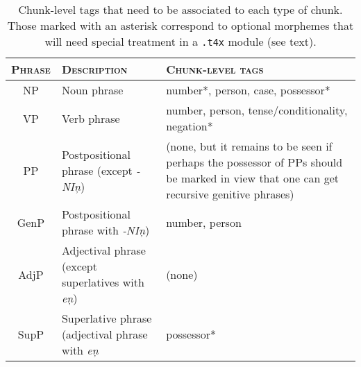 \documentclass{article}
\begin{document}
\begin{table}
\begin{center}
\begin{tabular}{c|p{4cm}|p{5.6cm}}
\hline\hline
\textsc{Phrase} & \textsc{Description} & \textsc{Chunk-level tags} \\\hline
NP & Noun phrase & number*, person, case, possessor* \\
VP & Verb phrase & number, person, tense/conditionality, negation* \\ 
PP & Postpositional phrase (except \emph{-NI\c{n}}) & (none, but it remains to be seen if perhaps the possessor of PPs should be marked in view that one can get recursive genitive phrases) \\
GenP & Postpositional phrase with \emph{-NI\c{n}}) & number, person \\
AdjP & Adjectival phrase (except superlatives with \emph{e\c{n}}) & (none) \\
SupP & Superlative phrase (adjectival phrase with \emph{e\c{n}} & possessor* \\\hline
\end{tabular}
\end{center}
\caption{Chunk-level tags that need to be associated to each type of chunk. Those marked with an asterisk correspond to optional morphemes that will need special treatment in a \texttt{.t4x} module (see text).}
\end{table}
\end{document}

